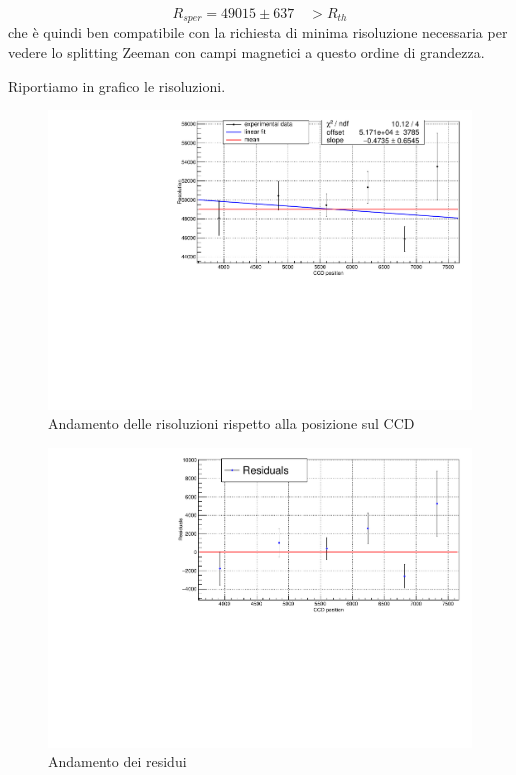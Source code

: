 \documentclass{article}
\begin{document}
	\[
		R_{sper} = 49015 \pm 637	\quad > R_{th}	
	\]
	che è quindi ben compatibile con la richiesta di minima risoluzione
	necessaria per vedere lo splitting Zeeman con campi magnetici a questo 
	ordine di grandezza.

	Riportiamo in grafico le risoluzioni.

	\begin{center}
		\begin{figure}[H]
			\centering
			\includegraphics[scale=0.38, angle=0]{campospento/ris.pdf}
			\setlength{\belowcaptionskip}{-20pt}
			\caption{Andamento delle risoluzioni rispetto alla posizione sul CCD}
			\label{fig:deltaxruBoffris}
		\end{figure}
	\end{center}

	\begin{center}
		\begin{figure}[H]
			\centering
			\includegraphics[scale=0.38, angle=0]{campospento/resris.pdf}
			\setlength{\belowcaptionskip}{-20pt}
			\caption{Andamento dei residui}
			\label{fig:deltaxruBoffresris}
		\end{figure}
	\end{center}
\end{document}
